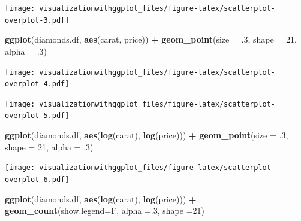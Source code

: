 \documentclass[]{krantz}
\makeatletter
\newenvironment{Shaded}{\begin{snugshade}}{\end{snugshade}}
\newcommand{\KeywordTok}[1]{\textcolor[rgb]{0.13,0.29,0.53}{\textbf{#1}}}
\newcommand{\DataTypeTok}[1]{\textcolor[rgb]{0.13,0.29,0.53}{#1}}
\newcommand{\DecValTok}[1]{\textcolor[rgb]{0.00,0.00,0.81}{#1}}
\newcommand{\StringTok}[1]{\textcolor[rgb]{0.31,0.60,0.02}{#1}}
\newcommand{\OperatorTok}[1]{\textcolor[rgb]{0.81,0.36,0.00}{\textbf{#1}}}
\newcommand{\NormalTok}[1]{#1}
\newenvironment{kframe}{%
\medskip{}
\setlength{\fboxsep}{.8em}
 \def\at@end@of@kframe{}%
 \ifinner\ifhmode%
  \def\at@end@of@kframe{\end{minipage}}%
  \begin{minipage}{\columnwidth}%
 \fi\fi%
 \def\FrameCommand##1{\hskip\@totalleftmargin \hskip-\fboxsep
 \colorbox{shadecolor}{##1}\hskip-\fboxsep
     \hskip-\linewidth \hskip-\@totalleftmargin \hskip\columnwidth}%
 \MakeFramed {\advance\hsize-\width
   \@totalleftmargin\z@ \linewidth\hsize
   \@setminipage}}%
 {\par\unskip\endMakeFramed%
 \at@end@of@kframe}
\renewenvironment{Shaded}{\begin{kframe}}{\end{kframe}}
\theoremstyle{definition}
\theoremstyle{definition}
\theoremstyle{definition}
\theoremstyle{remark}
\makeatother
\begin{document}
\texttt{[image: visualizationwithggplot\_files/figure-latex/scatterplot-overplot-3.pdf]}

\begin{Shaded}
\begin{Highlighting}[]
\KeywordTok{ggplot}\NormalTok{(diamonds.df, }\KeywordTok{aes}\NormalTok{(carat, price)) }\OperatorTok{+}
\StringTok{  }\KeywordTok{geom_point}\NormalTok{(}\DataTypeTok{size =}\NormalTok{ .}\DecValTok{3}\NormalTok{, }\DataTypeTok{shape =} \DecValTok{21}\NormalTok{, }\DataTypeTok{alpha =}\NormalTok{ .}\DecValTok{3}\NormalTok{)}
\end{Highlighting}
\end{Shaded}

\texttt{[image: visualizationwithggplot\_files/figure-latex/scatterplot-overplot-4.pdf]}

\begin{Shaded}
\end{Shaded}

\texttt{[image: visualizationwithggplot\_files/figure-latex/scatterplot-overplot-5.pdf]}

\begin{Shaded}
\begin{Highlighting}[]
\KeywordTok{ggplot}\NormalTok{(diamonds.df, }\KeywordTok{aes}\NormalTok{(}\KeywordTok{log}\NormalTok{(carat), }\KeywordTok{log}\NormalTok{(price))) }\OperatorTok{+}
\StringTok{  }\KeywordTok{geom_point}\NormalTok{(}\DataTypeTok{size =}\NormalTok{ .}\DecValTok{3}\NormalTok{, }\DataTypeTok{shape =} \DecValTok{21}\NormalTok{, }\DataTypeTok{alpha =}\NormalTok{ .}\DecValTok{3}\NormalTok{)}
\end{Highlighting}
\end{Shaded}

\texttt{[image: visualizationwithggplot\_files/figure-latex/scatterplot-overplot-6.pdf]}

\begin{Shaded}
\begin{Highlighting}[]
\KeywordTok{ggplot}\NormalTok{(diamonds.df, }\KeywordTok{aes}\NormalTok{(}\KeywordTok{log}\NormalTok{(carat), }\KeywordTok{log}\NormalTok{(price))) }\OperatorTok{+}
\StringTok{  }\KeywordTok{geom_count}\NormalTok{(}\DataTypeTok{show.legend=}\NormalTok{F, }\DataTypeTok{alpha =}\NormalTok{.}\DecValTok{3}\NormalTok{, }\DataTypeTok{shape =}\DecValTok{21}\NormalTok{)}
\end{Highlighting}
\end{Shaded}
\end{document}
